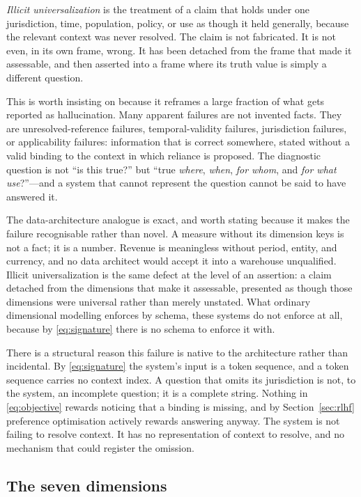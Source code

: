 \documentclass[11pt]{article}
\theoremstyle{plain}
\theoremstyle{definition}
\begin{document}
\emph{Illicit universalization} is the treatment of a claim that holds under one
jurisdiction, time, population, policy, or use as though it held generally, because
the relevant context was never resolved. The claim is not fabricated. It is not
even, in its own frame, wrong. It has been detached from the frame that made it
assessable, and then asserted into a frame where its truth value is simply a
different question.

This is worth insisting on because it reframes a large fraction of what gets
reported as hallucination. Many apparent failures are not invented facts. They are
unresolved-reference failures, temporal-validity failures, jurisdiction failures,
or applicability failures: information that is correct somewhere, stated without a
valid binding to the context in which reliance is proposed. The diagnostic question
is not ``is this true?'' but ``true \emph{where}, \emph{when}, \emph{for whom}, and
\emph{for what use}?''---and a system that cannot represent the question cannot be
said to have answered it.

The data-architecture analogue is exact, and worth stating because it makes the
failure recognisable rather than novel. A measure without its dimension keys is not
a fact; it is a number. Revenue is meaningless without period, entity, and currency,
and no data architect would accept it into a warehouse unqualified. Illicit
universalization is the same defect at the level of an assertion: a claim detached
from the dimensions that make it assessable, presented as though those dimensions
were universal rather than merely unstated. What ordinary dimensional modelling
enforces by schema, these systems do not enforce at all, because by
\eqref{eq:signature} there is no schema to enforce it with.

There is a structural reason this failure is native to the architecture rather than
incidental. By \eqref{eq:signature} the system's input is a token sequence, and a
token sequence carries no context index. A question that omits its jurisdiction is
not, to the system, an incomplete question; it is a complete string. Nothing in
\eqref{eq:objective} rewards noticing that a binding is missing, and by
Section~\ref{sec:rlhf} preference optimisation actively rewards answering anyway.
The system is not failing to resolve context. It has no representation of context
to resolve, and no mechanism that could register the omission.

\subsection{The seven dimensions}
\label{sec:six-dimensions}
\end{document}
